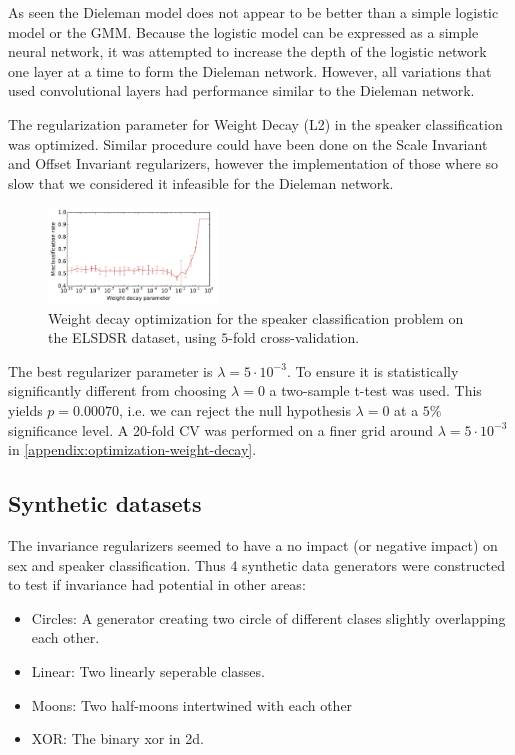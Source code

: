 As seen the Dieleman model does not appear to be better than a simple logistic model or the GMM. Because the logistic model can be expressed as a simple neural network, it was attempted to increase the depth of the logistic network one layer at a time to form the Dieleman network. However, all variations that used convolutional layers had performance similar to the Dieleman network.

The regularization parameter for Weight Decay (L2) in the speaker classification was optimized. Similar procedure could have been done on the Scale Invariant and Offset Invariant regularizers, however the implementation of those where so slow that we considered it infeasible for the Dieleman network.

\begin{figure}[H]
  \centering
  \includegraphics[width=0.4\textwidth]{plots/reg_opt_dieleman_speaker_elsdsr}
  \caption{Weight decay optimization for the speaker classification problem on the ELSDSR dataset, using $5$-fold cross-validation.}
  \label{fig:reg_opt}
\end{figure}

The best regularizer parameter is $\lambda = 5 \cdot 10^{-3}$. To ensure it is statistically significantly different from choosing $\lambda = 0$ a two-sample t-test was used. This yields $p = 0.00070$, i.e. we can reject the null hypothesis $\lambda=0$ at a $5\%$ significance level. A 20-fold CV was performed on a finer grid around $\lambda = 5 \cdot 10^{-3}$ in \cref{appendix:optimization-weight-decay}.

\subsection{Synthetic datasets}

The invariance regularizers seemed to have a no impact (or negative impact) on sex and speaker classification. Thus 4 synthetic data generators were constructed to test if invariance had potential in other areas:
\begin{itemize}
\item{Circles: A generator creating two circle of different clases slightly overlapping each other.}
\item{Linear: Two linearly seperable classes.}
\item{Moons: Two half-moons intertwined with each other}
\item{XOR: The binary xor in 2d.}
\end{itemize}

